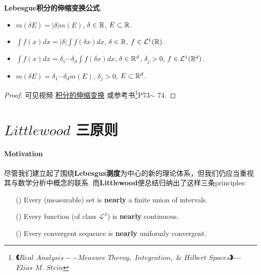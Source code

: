 	\vspace{4em}
	
	\begin{proposition}\label{prop 3.7.1}
		\textbf{Lebesgue积分的伸缩变换公式}.
		\begin{itemize}
			\item $m(\delta E) = \left| \delta \right| m(E)$, $\delta \in \mathbb{R}$, $E \subset \mathbb{R}$.
			
			\item $\int{f(x) dx} = \left| \delta \right| \int{f(\delta x) dx}$, $\delta \in \mathbb{R}$, $f \in \mathcal{L}^{1}(\mathbb{R})$.
			
			\item $\int{f(x) dx} = \delta_1 \cdots \delta_d \int{f(\delta x) dx}$, $\delta \in \mathbb{R}^d$, $\delta_j > 0$, $f \in \mathcal{L}^{1}(\mathbb{R}^d)$.
			
			\item $m(\delta E) = \delta_1 \cdots \delta_d m(E)$, $\delta_j > 0$, $E \subset \mathbb{R}^d$.
		\end{itemize}
	
		\vspace{4em}
		\begin{proof}
			可见视频 \href{https://www.bilibili.com/video/BV1FT411C7wM?p=29}{积分的伸缩变换} 或参考书\footnote{\textbf{《$Real \,\, Analysis -- Measure \,\, Theroy, \,\, Integration, \,\, \& \,\, Hilbert \,\, Spaces$》--- $Elias \,\, M. \,\, Stein$}}P73$\sim$ 74.
		\end{proof}
	\end{proposition}

\newpage
\section{$Littlewood$ 三原则}
\paragraph{\textbf{Motivation}}
	尽管我们建立起了围绕\textbf{Lebesgus测度}为中心的新的理论体系，但我们仍应当重视其与数学分析中概念的联系. 而\textbf{Littlewood}便总结归纳出了这样三条principles:
	
	\vspace{1em}
	
	\begin{enumerate}
		\item[(\rmnum{1})]Every (measurable) set is \textbf{nearly} a finite union of intervals.
		
		\item[(\rmnum{2})]Every function (of class $\mathcal{L}^{\lambda}$) is \textbf{nearly} continuous.
		
		\item[(\rmnum{3})]Every convergent sequence is \textbf{nearly} uniformly convergent.
	\end{enumerate}
	
